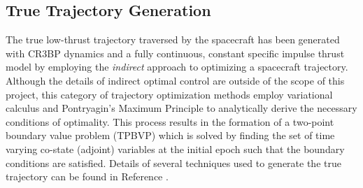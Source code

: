 \documentclass[letterpaper, submit]{AAS}			%
\begin{document}
\subsection{True Trajectory Generation}
The true low-thrust trajectory traversed by the spacecraft has been generated with CR3BP dynamics and a fully continuous, constant specific impulse thrust model by employing the \textit{indirect} approach to optimizing a spacecraft trajectory. Although the details of indirect optimal control are outside of the scope of this project, this category of trajectory optimization methods employ variational calculus and Pontryagin's Maximum Principle to analytically derive the necessary conditions of optimality. This process results in the formation of a two-point boundary value problem (TPBVP) which is solved by finding the set of time varying co-state (adjoint) variables at the initial epoch such that the boundary conditions are satisfied. Details of several techniques used to generate the true trajectory can be found in Reference .
\end{document}
